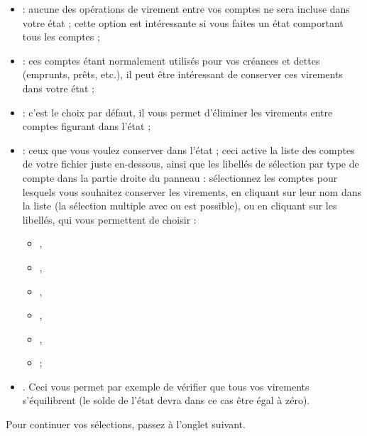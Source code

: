 \begin{itemize}
	\item {} : aucune des opérations de virement entre vos comptes ne sera incluse dans votre état ; cette option est intéressante si vous faites un état comportant tous les comptes ;
	\item {} : ces comptes étant normalement utilisés pour vos créances et dettes (emprunts, prêts, etc.), il peut être intéressant de conserver ces virements dans votre état ;
	\item {} : c'est le choix par défaut, il vous permet d'éliminer les virements entre comptes figurant dans l'état ;
	\item {} : ceux que vous voulez conserver dans l'état ; ceci active la liste des comptes de votre fichier juste en-dessous, ainsi que les libellés de sélection par type de compte dans la partie droite du panneau : sélectionnez les comptes pour lesquels vous souhaitez conserver les virements, en cliquant sur leur nom dans la liste (la sélection multiple avec  ou   est possible), ou en cliquant sur les libellés, qui vous permettent de choisir :
	
	\begin{itemize}
		  \item {},
		  \item {},
		  \item {},
		  \item {},
		  \item {},
		  \item {} ;
	\end{itemize} 
	
	\item {}. Ceci vous permet par exemple de vérifier que tous vos virements s'équilibrent (le solde de l'état devra dans ce cas être égal à zéro).
\end{itemize} 

Pour continuer vos sélections, passez à l'onglet suivant.


